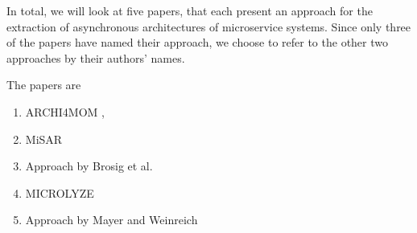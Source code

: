 
In total, we will look at five papers, that each present an approach for the extraction of asynchronous architectures of microservice systems.
Since only three of the papers have named their approach, we choose to refer to the other two approaches by their authors' names.

The papers are
\begin{enumerate}
	\item ARCHI4MOM \cite{Singh2022ARCHI4MOM}, \cite{Singh2021}
	\item MiSAR \cite{Alshuqayran2018MiSAR}
	\item Approach by Brosig et al. \cite{Brosig2011}
	\item MICROLYZE \cite{Kleehaus2018} %
	\item Approach by Mayer and Weinreich \cite{Mayer2018} %
\end{enumerate}